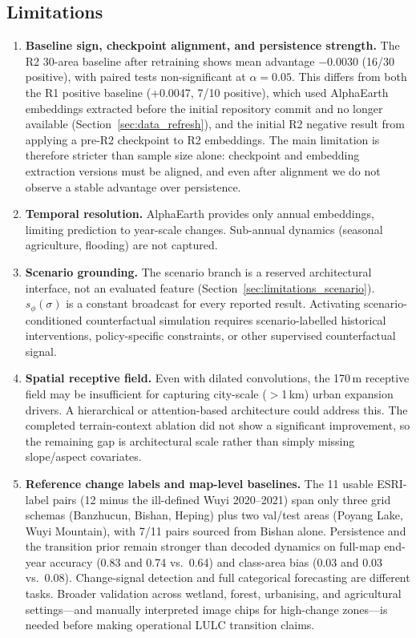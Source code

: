 \documentclass{article}
\begin{document}
\subsection{Limitations}
\label{sec:limitations}

\begin{enumerate}
\item \label{lim:power} \textbf{Baseline sign, checkpoint alignment, and persistence strength.} The R2 30-area baseline after retraining shows mean advantage $-0.0030$ (16/30 positive), with paired tests non-significant at $\alpha=0.05$. This differs from both the R1 positive baseline (+0.0047, 7/10 positive), which used AlphaEarth embeddings extracted before the initial repository commit and no longer available (Section~\ref{sec:data_refresh}), and the initial R2 negative result from applying a pre-R2 checkpoint to R2 embeddings. The main limitation is therefore stricter than sample size alone: checkpoint and embedding extraction versions must be aligned, and even after alignment we do not observe a stable advantage over persistence.

\item \label{lim:temporal} \textbf{Temporal resolution.} AlphaEarth provides only annual embeddings, limiting prediction to year-scale changes. Sub-annual dynamics (seasonal agriculture, flooding) are not captured.

\item \label{lim:scenario} \textbf{Scenario grounding.} The scenario branch is a reserved architectural interface, not an evaluated feature (Section~\ref{sec:limitations_scenario}). $s_\phi(\sigma)$ is a constant broadcast for every reported result. Activating scenario-conditioned counterfactual simulation requires scenario-labelled historical interventions, policy-specific constraints, or other supervised counterfactual signal.

\item \label{lim:receptive} \textbf{Spatial receptive field.} Even with dilated convolutions, the 170\,m receptive field may be insufficient for capturing city-scale ($>$1\,km) urban expansion drivers. A hierarchical or attention-based architecture could address this. The completed terrain-context ablation did not show a significant improvement, so the remaining gap is architectural scale rather than simply missing slope/aspect covariates.

\item \label{lim:reference} \textbf{Reference change labels and map-level baselines.} The 11 usable ESRI-label pairs (12 minus the ill-defined Wuyi 2020--2021) span only three grid schemas (Banzhucun, Bishan, Heping) plus two val/test areas (Poyang Lake, Wuyi Mountain), with 7/11 pairs sourced from Bishan alone. Persistence and the transition prior remain stronger than decoded dynamics on full-map end-year accuracy (0.83 and 0.74 vs.\ 0.64) and class-area bias (0.03 and 0.03 vs.\ 0.08). Change-signal detection and full categorical forecasting are different tasks. Broader validation across wetland, forest, urbanising, and agricultural settings---and manually interpreted image chips for high-change zones---is needed before making operational LULC transition claims.


\end{enumerate}
\end{document}
